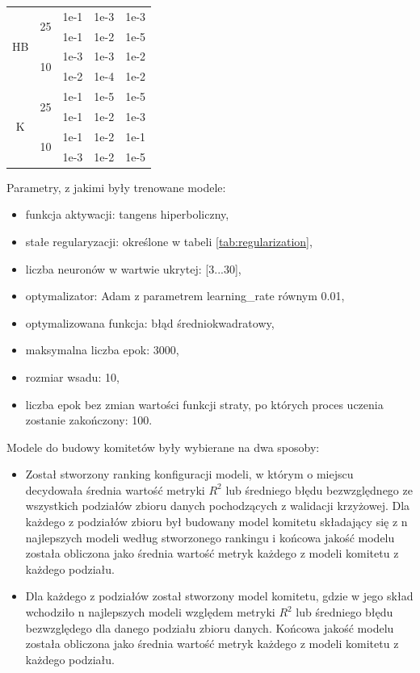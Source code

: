 \begin{table}
\begin{tabular}{|c|c|c|c|c|}
        \hline
        \multirow{4}{*}{HB} & \multirow{2}{*}{25} & 1e-1&1e-3&1e-3 \\
        \cline{3-5}
        && 1e-1	&1e-2&1e-5 \\
        \cline{2-5}
        & \multirow{2}{*}{10} & 1e-3&1e-3&1e-2 \\ 
        \cline{3-5}
        && 1e-2&1e-4&1e-2 \\
         \hline
        \multirow{4}{*}{K} & \multirow{2}{*}{25} & 1e-1	&1e-5&1e-5 \\
        \cline{3-5}
        && 1e-1&1e-2&1e-3 \\
        \cline{2-5}
        & \multirow{2}{*}{10} & 1e-1&1e-2&	1e-1 \\ 
        \cline{3-5}
        && 1e-3&1e-2&1e-5 \\
        \hline
    \end{tabular}
    
\end{table}

Parametry, z jakimi były trenowane modele:
\begin{itemize}
    \item funkcja aktywacji: tangens hiperboliczny,
    \item stałe regularyzacji: określone w tabeli \ref{tab:regularization},
    \item liczba neuronów w wartwie ukrytej: [3...30],
    \item optymalizator: Adam z parametrem learning\_rate równym 0.01,
    \item optymalizowana funkcja: błąd średniokwadratowy,
    \item maksymalna liczba epok: 3000,
    \item rozmiar wsadu: 10,
    \item liczba epok bez zmian wartości funkcji straty, po których proces uczenia zostanie zakończony: 100.
\end{itemize}

Modele do budowy komitetów były wybierane na dwa sposoby:
\begin{itemize}
    \item Został stworzony ranking konfiguracji modeli, w którym o miejscu decydowała średnia wartość metryki $R^{2}$ lub średniego błędu bezwzględnego ze wszystkich podziałów zbioru danych pochodzących z walidacji krzyżowej. Dla każdego z podziałów zbioru był budowany model komitetu składający się z n najlepszych modeli według stworzonego rankingu i końcowa jakość modelu została obliczona jako średnia wartość metryk każdego z modeli komitetu z każdego podziału.
    \item Dla każdego z podziałów został stworzony model komitetu, gdzie w jego skład wchodziło n najlepszych modeli względem metryki $R^{2}$ lub średniego błędu bezwzględego dla danego podziału zbioru danych. Końcowa jakość modelu została obliczona jako średnia wartość metryk każdego z modeli komitetu z każdego podziału.
\end{itemize}

